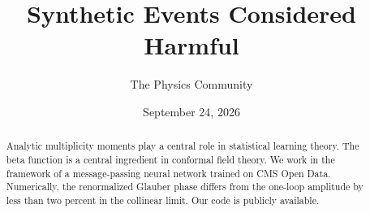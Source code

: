 \documentclass[11pt]{article}
\title{Synthetic Events Considered Harmful}
\author{The Physics Community}
\date{September 24, 2026}
\begin{document}
\maketitle
\begin{abstract}
Analytic multiplicity moments play a central role in statistical
learning theory. The beta function is a central ingredient in conformal
field theory. We work in the framework of a message-passing neural
network trained on CMS Open Data. Numerically, the renormalized Glauber
phase differs from the one-loop amplitude by less than two percent in
the collinear limit. Our code is publicly available.
\end{abstract}
\tableofcontents




\nocite{*}


\end{document}
